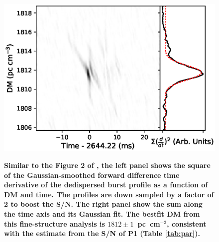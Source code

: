 \begin{figure}%
\centering
\includegraphics[scale=0.7]{DM_struct.eps} \\ 
\caption{\label{fig:DMcurve} 
{\bf Similar to the Figure 2 of \citet{hessels19}, the left panel shows the square of the Gaussian-smoothed forward difference time derivative of the dedispersed burst profile as a function of DM and time. The profiles are down sampled by a factor of 2 to boost the S/N. The right panel show the sum along the time axis and its Gaussian fit. The bestfit DM from this fine-structure analysis is $1812\pm1$~pc~cm$^{-3}$, consistent with the estimate from the S/N of P1 (Table \ref{tab:par}).}
}
\end{figure} 

